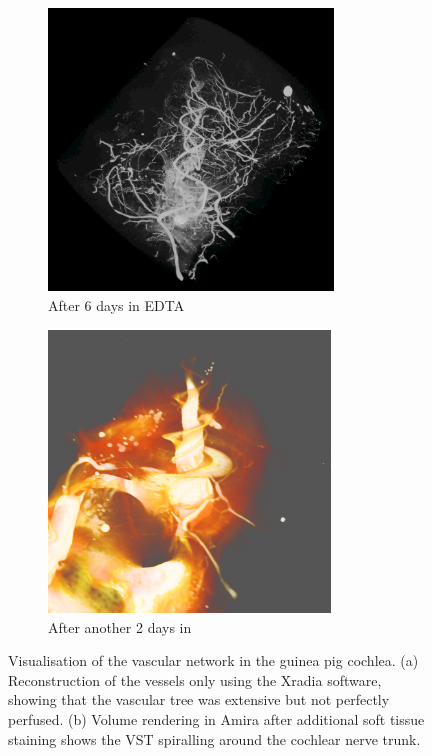 \begin{figure}[t]
    \centering
	
	\begin{subfigure}[t]{0.5\textwidth}
        \centering
        \includegraphics[height=7.5cm]{Simulations/Vasculature/microfil_vessels_video}
        \caption{After 6 days in EDTA}
        \label{fig:microfil_vessels}
    \end{subfigure}%
    \hfill%
	\begin{subfigure}[t]{0.5\textwidth}
        \centering
        \includegraphics[height=7.5cm]{Simulations/Vasculature/volren_15000-18500}
        \caption{After another 2 days in }
        \label{fig:microfil_volren}
    \end{subfigure}%
	
	\caption[Visualisation of the vascular network in the guinea pig
	cochlea]{Visualisation of the vascular network in the guinea pig cochlea. (a)
	Reconstruction of the vessels only using the Xradia software, showing that the
	vascular tree was extensive but not perfectly perfused. (b) Volume rendering
	in Amira after additional soft tissue staining shows the VST spiralling around
	the cochlear nerve trunk.}
	\label{fig:microfil_microCT}
\end{figure}

